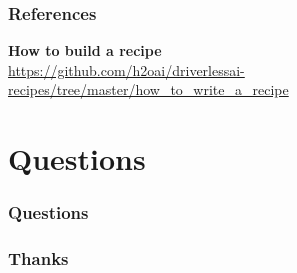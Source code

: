 \documentclass[11pt,
               aspectratio=169,
               hyperref={colorlinks}
               ]{beamer}
\begin{document}

	\begin{frame}[t, allowframebreaks]
	
		\frametitle{References}	
		
			\textbf{How to build a recipe}\\
			\small{\url{https://github.com/h2oai/driverlessai-recipes/tree/master/how_to_write_a_recipe}}
			
		\framebreak		
		
		\printbibliography
		
	\end{frame}
	\section{Questions}

		\begin{frame}

			\frametitle{Questions}

		\end{frame}


		\begin{frame}

			\frametitle{Thanks}

		\end{frame}
\end{document}
